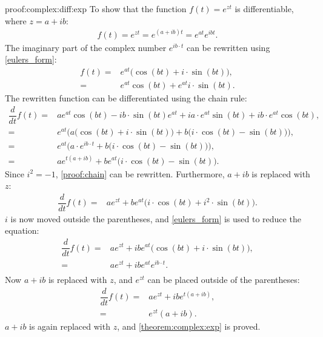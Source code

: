 \begin{prof}{}{proof:complex:diff:exp}
To show that the function $f(t)=e^{z t}$ is differentiable, where $z=a+ ib$:
\begin{align*}
	f(t) = e^{zt}= e^{(a+ib)t}= e^{at}  e^{ib t}.
\end{align*}
The imaginary part of the complex number $e^{ib\cdot t}$ can be rewritten using \cref{eulers_form}:
\begin{align*}
	f(t) =& e^{at}\big(\cos(bt)+i \cdot \sin(bt)\big), \\
		 =& e^{at}\cos(bt) + e^{at} i \cdot \sin(bt).
\end{align*}
The rewritten function can be differentiated using the chain rule:
\begin{align}
	\dfrac{d}{dt}f(t) =& ae^{at}\cos(bt) -ib \cdot \sin(bt)e^{at} + ia \cdot e^{at}\sin(bt) + ib \cdot e^{at}\cos(bt), \nonumber \\
	=& e^{at} \bigg( a\big(\cos(bt) + i \cdot \sin(bt)\big) + b\big(i \cdot \cos(bt) - \sin(bt)\big) \bigg), \nonumber \\
	=& e^{at}\bigg(a \cdot e^{ib \cdot t}+b\big(i \cdot \cos(bt) - \sin(bt)\big)\bigg), \nonumber \\
	=& a e^{t(a+ib)} + b e^{at}\big(i \cdot \cos(bt) - \sin(bt)\big). \label{proof:chain}
\end{align}
Since $i^2 = -1$, \eqref{proof:chain} can be rewritten. Furthermore, $a+ib$ is replaced with $z$:
\begin{align*}
	\dfrac{d}{dt}f(t) =& a e^{zt} + b e^{at}\big(i \cdot \cos(bt) + i^2 \cdot \sin(bt)\big).
\end{align*}
$i$ is now moved outside the parentheses, and \cref{eulers_form} is used to reduce the equation:
\begin{align*}
	\dfrac{d}{dt}f(t) =&  a e^{zt} + ib e^{at}\big(\cos(bt) + i \cdot \sin(bt)\big), \\
	=&  a e^{zt} + ib e^{at}e^{ib \cdot t}. \\
\end{align*}
Now $a+ib$ is replaced with $z$, and $e^{zt}$ can be placed outside of the parentheses:
\begin{align*}
	\dfrac{d}{dt}f(t) =&  a e^{zt} + ib e^{t(a+ib)}, \\
	=&  e^{zt}(a+ib).
\end{align*}
$a+ib$ is again replaced with $z$, and \cref{theorem:complex:exp} is proved.
\end{prof}

